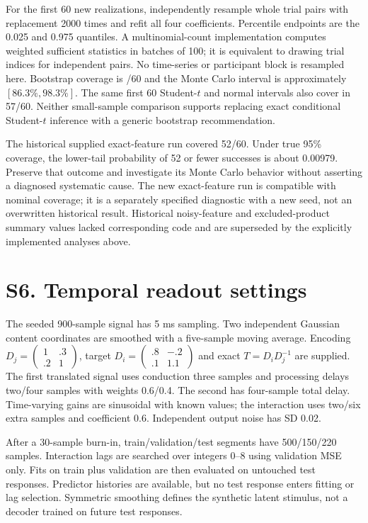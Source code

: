 \documentclass[11pt,a4paper]{article}
\begin{document}
For the first 60 new realizations, independently resample whole trial pairs with replacement 2000 times and refit all four coefficients. Percentile endpoints are the 0.025 and 0.975 quantiles. A multinomial-count implementation computes weighted sufficient statistics in batches of 100; it is equivalent to drawing trial indices for independent pairs. No time-series or participant block is resampled here. Bootstrap coverage is \BootCount{}/60 and the Monte Carlo interval is approximately $[86.3\%,98.3\%]$. The same first 60 Student-$t$ and normal intervals also cover in 57/60. Neither small-sample comparison supports replacing exact conditional Student-$t$ inference with a generic bootstrap recommendation.

The historical supplied exact-feature run covered 52/60. Under true 95\% coverage, the lower-tail probability of 52 or fewer successes is about 0.00979. Preserve that outcome and investigate its Monte Carlo behavior without asserting a diagnosed systematic cause. The new exact-feature run is compatible with nominal coverage; it is a separately specified diagnostic with a new seed, not an overwritten historical result. Historical noisy-feature and excluded-product summary values lacked corresponding code and are superseded by the explicitly implemented analyses above.

\section*{S6. Temporal readout settings}
The seeded 900-sample signal has 5 ms sampling. Two independent Gaussian content coordinates are smoothed with a five-sample moving average. Encoding $D_j=\left(\begin{smallmatrix}1&.3\\.2&1\end{smallmatrix}\right)$, target $D_i=\left(\begin{smallmatrix}.8&-.2\\.1&1.1\end{smallmatrix}\right)$ and exact $T=D_iD_j^{-1}$ are supplied. The first translated signal uses conduction three samples and processing delays two/four samples with weights 0.6/0.4. The second has four-sample total delay. Time-varying gains are sinusoidal with known values; the interaction uses two/six extra samples and coefficient 0.6. Independent output noise has SD 0.02.

After a 30-sample burn-in, train/validation/test segments have 500/150/220 samples. Interaction lags are searched over integers 0--8 using validation MSE only. Fits on train plus validation are then evaluated on untouched test responses. Predictor histories are available, but no test response enters fitting or lag selection. Symmetric smoothing defines the synthetic latent stimulus, not a decoder trained on future test responses.
\end{document}
